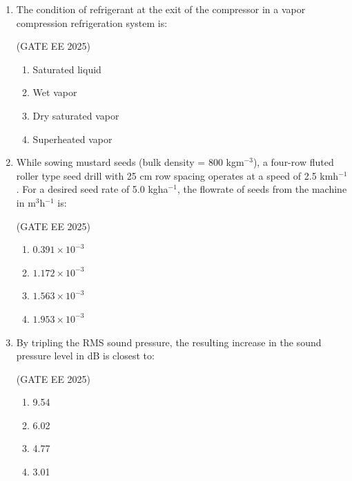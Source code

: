 \documentclass[journal,12pt,onecolumn]{IEEEtran}
\theoremstyle{remark}
\begin{document}
\begin{enumerate}
\begin{multicols}{4}
\begin{enumerate}
\item 0.98
\item 0.70
\item 0.31
\item 0.17
\end{enumerate}
\end{multicols}

\item The condition of refrigerant at the exit of the compressor in a vapor compression refrigeration system is:

\hfill(GATE EE 2025)

\begin{multicols}{4}
\begin{enumerate}
\item Saturated liquid
\item Wet vapor
\item Dry saturated vapor
\item Superheated vapor
\end{enumerate}
\end{multicols}

\item While sowing mustard seeds (bulk density = 800 kgm$^{-3}$), a four-row fluted roller type seed drill with 25 cm row spacing operates at a speed of 2.5 kmh$^{-1}$. For a desired seed rate of 5.0 kgha$^{-1}$, the flowrate of seeds from the machine in m$^3$h$^{-1}$ is:

\hfill(GATE EE 2025)

\begin{multicols}{4}
\begin{enumerate}
\item $0.391 \times 10^{-3}$
\item $1.172 \times 10^{-3}$
\item $1.563 \times 10^{-3}$
\item $1.953 \times 10^{-3}$
\end{enumerate}
\end{multicols}


\item By tripling the RMS sound pressure, the resulting increase in the sound pressure level in dB is closest to:

\hfill(GATE EE 2025)

\begin{multicols}{4}
\begin{enumerate}
\item 9.54
\item 6.02
\item 4.77
\item 3.01
\end{enumerate}
\end{multicols}


\end{enumerate}
\end{document}
